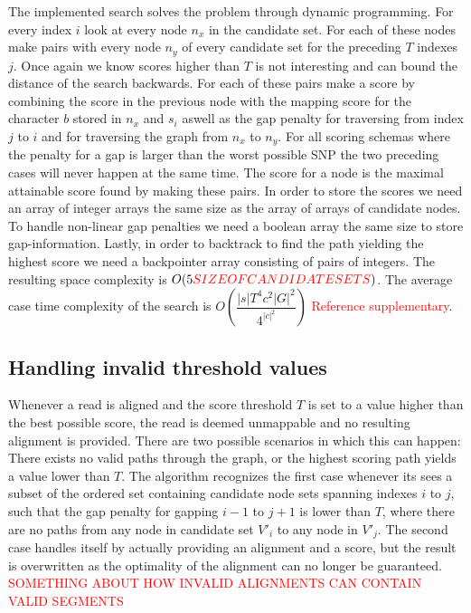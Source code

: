 \documentclass{article}
\begin{document}
The implemented search solves the problem through dynamic programming. For every index $i$ look at every node $n_x$ in the candidate set. For each of these nodes make pairs with every node $n_y$ of every candidate set for the preceding $T$ indexes $j$. Once again we know scores higher than $T$ is not interesting and can bound the distance of the search backwards. For each of these pairs make a score by combining the score in the previous node with the mapping score for the character $b$ stored in $n_x$ and $s_i$ aswell as the gap penalty for traversing from index $j$ to $i$ and for traversing the graph from $n_x$ to $n_y$. For all scoring schemas where the penalty for a gap is larger than the worst possible SNP the two preceding cases will never happen at the same time. The score for a node is the maximal attainable score found by making these pairs. In order to store the scores we need an array of integer arrays the same size as the array of arrays of candidate nodes. To handle non-linear gap penalties we need a boolean array the same size to store gap-information. Lastly, in order to backtrack to find the path yielding the highest score we need a backpointer array consisting of pairs of integers. The resulting space complexity is $O(5\textcolor{red}{SIZE OF CANDIDATE SETS})$. The average case time complexity of the search is $O(\dfrac{|s|T^4c^2|G|^2}{4^{|c|^2}})$ \textcolor{red}{Reference supplementary}.
\subsection{Handling invalid threshold values}
Whenever a read is aligned and the score threshold $T$ is set to a value higher than the best possible score, the read is deemed unmappable and no resulting alignment is provided. There are two possible scenarios in which this can happen: There exists no valid paths through the graph, or the highest scoring path yields a value lower than $T$. The algorithm recognizes the first case whenever its sees a subset of the ordered set containing candidate node sets spanning indexes $i$ to $j$, such that the gap penalty for gapping $i-1$ to $j+1$ is lower than $T$, where there are no paths from any node in candidate set $V'_i$ to any node in $V'_j$. The second case handles itself by actually providing an alignment and a score, but the result is overwritten as the optimality of the alignment can no longer be guaranteed. \textcolor{red}{SOMETHING ABOUT HOW INVALID ALIGNMENTS CAN CONTAIN VALID SEGMENTS}
\end{document}
